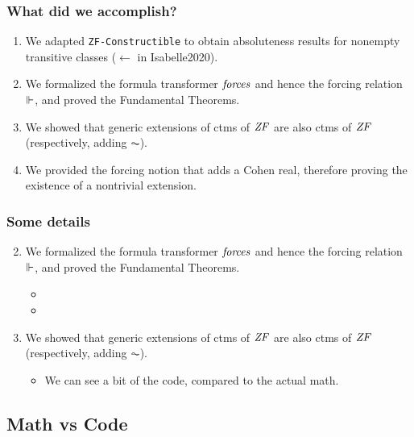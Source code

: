 \documentclass[english]{beamer}
\begin{document}
\begin{frame}
  \frametitle{What did we accomplish?}
  \begin{shadowblock}{}
    \begin{enumerate}
    \item<1-> We adapted \texttt{ZF-Constructible} to obtain
      absoluteness results for nonempty transitive classes ($\leftarrow$
      \alert{in Isabelle2020}).

    \item<3-> We formalized the formula transformer $\mathit{forces}$ and
      hence the forcing relation $\Vdash$, and proved the Fundamental
      Theorems.
    \item<4-> We showed that generic extensions of ctms of $\mathit{ZF}$ are also
      ctms of $\mathit{ZF}$ (respectively, adding $\AC$).
    \item<5-> We provided the forcing notion that adds a Cohen real,
      therefore proving the existence of a nontrivial extension.
    \end{enumerate}
  \end{shadowblock}
\end{frame}

\begin{frame}
  \frametitle{Some details}
  \begin{enumerate}\setcounter{enumi}{1}
  \item<+-> We formalized the formula transformer $\mathit{forces}$ and
    hence the forcing relation $\Vdash$, and proved the Fundamental
    Theorems.
    \begin{itemize}
    \item<+-> 
    \item<+-> 
    \end{itemize}
  \item<+-> We showed that generic extensions of ctms of $\mathit{ZF}$ are also
    ctms of $\mathit{ZF}$ (respectively, adding $\AC$).
    \begin{itemize}
    \item<+-> We can see a bit of the code, compared to the actual math.
    \end{itemize}
  \end{enumerate}
\end{frame}

\subsection{Math vs Code}
\end{document}
